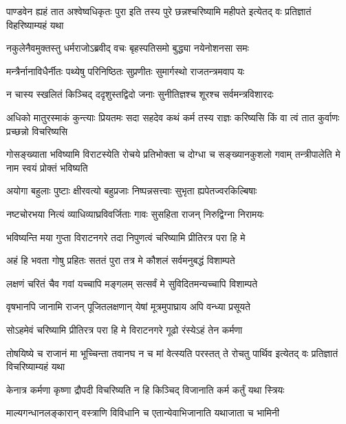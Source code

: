 \threelineshloka
{पाण्डवेन ह्यहं तात अश्वेष्वधिकृतः पुरा}
{इति तस्य पुरे छन्नश्चरिष्यामि महीपते}
{इत्येतद् वः प्रतिज्ञातं विहरिष्याम्यहं यथा}



\twolineshloka
{नकुलेनैवमुक्तस्तु धर्मराजोऽब्रवीद् वचः}
{बृहस्पतिसमो बुद्ध्या नयेनोशनसा समः}


\twolineshloka
{मन्त्रैर्नानाविधैर्नीतः पथ्येषु परिनिष्ठितः}
{सुप्रणीतः सुमार्गस्थो राजतन्त्रमवाप यः}


\twolineshloka
{न चास्य स्खलितं किञ्चिद् ददृशुस्तद्विदो जनाः}
{सुनीतिज्ञश्च शूरश्च सर्वमन्त्रविशारदः}


\threelineshloka
{अधिको मातुरस्माकं कुन्त्याः प्रियतमः सदा}
{सहदेव कथं कर्म तस्य राज्ञः करिष्यसि}
{किं वा त्वं तात कुर्वाणः प्रच्छन्नो विचरिष्यसि}




\threelineshloka
{गोसङ्ख्याता भविष्यामि विराटस्येति रोचये}
{प्रतिभोक्ता च दोग्धा च सङ्ख्यानकुशलो गवाम्}
{तन्त्रीपालेति मे नाम स्वयं प्रोक्तं भविष्यति}


\twolineshloka
{अयोगा बहुलाः पुष्टाः क्षीरवत्यो बहुप्रजाः}
{निष्पन्नसत्त्वाः सुभृता ह्यपेतज्वरकिल्बिषाः}


\twolineshloka
{नष्टचोरभया नित्यं व्याधिव्याघ्रविवर्जिताः}
{गावः सुसहिता राजन् निरुद्विग्ना निरामयः}


\twolineshloka
{भविष्यन्ति मया गुप्ता विराटनगरे तदा}
{निपुणत्वं चरिष्यामि प्रीतिरत्र परा हि मे}


\twolineshloka
{अहं हि भवता गोषु प्रहितः सततं पुरा}
{तत्र मे कौशलं सर्वमनुबद्धं विशाम्पते}


\twolineshloka
{लक्षणं चरितं चैव गवां यच्चापि मङ्गलम्}
{सत्सर्वं मे सुविदितमन्यच्चापि विशाम्पते}


\twolineshloka
{वृषभानपि जानामि राजन् पूजितलक्षणान्}
{येषां मूत्रमुपाघ्राय अपि वन्ध्या प्रसूयते}


\twolineshloka
{सोऽहमेवं चरिष्यामि प्रीतिरत्र परा हि मे}
{विराटनगरे गूढो रंस्येऽहं तेन कर्मणा}


\threelineshloka
{तोषयिष्ये च राजानं मा भूच्चिन्ता तवानघ}
{न च मां वेत्स्यति परस्तत् ते रोचतु पार्थिव}
{इत्येतद् वः प्रतिज्ञातं विचरिष्याम्यहं यथा}




\twolineshloka
{केनात्र कर्मणा कृष्णा द्रौपदी विचरिष्यति}
{न हि किञ्चिद् विजानाति कर्म कर्तुं यथा स्त्रियः}


\twolineshloka
{माल्यगन्धानलङ्कारान् वस्त्राणि विविधानि च}
{एतान्येवाभिजानाति यथाजाता च भामिनी}


